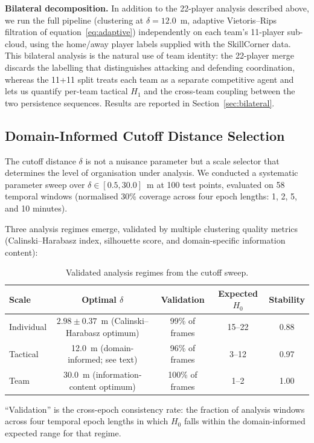 \textbf{Bilateral decomposition.} In addition to the 22-player analysis described above, we run the full pipeline (clustering at \(\delta=12.0\)~m, adaptive Vietoris--Rips filtration of equation~\eqref{eq:adaptive}) independently on each team's 11-player sub-cloud, using the home/away player labels supplied with the SkillCorner data. This bilateral analysis is the natural use of team identity: the 22-player merge discards the labelling that distinguishes attacking and defending coordination, whereas the 11+11 split treats each team as a separate competitive agent and lets us quantify per-team tactical \(H_1\) and the cross-team coupling between the two persistence sequences. Results are reported in Section~\ref{sec:bilateral}.

\subsection{Domain-Informed Cutoff Distance Selection}
\label{sec:cutoff}

The cutoff distance \(\delta\) is not a nuisance parameter but a scale selector that determines the level of organisation under analysis. We conducted a systematic parameter sweep over \(\delta\in[0.5,30.0]\)~m at 100 test points, evaluated on 58 temporal windows (normalised 30\% coverage across four epoch lengths: 1, 2, 5, and 10 minutes).

Three analysis regimes emerge, validated by multiple clustering quality metrics (Calinski--Harabasz index, silhouette score, and domain-specific information content):

\begin{table}[H]
  \centering
  \begin{threeparttable}
    \caption{Validated analysis regimes from the cutoff sweep.}
    \label{tab:regimes}
    \begin{tabular}{@{}lcccc@{}}
      \toprule
      Scale & Optimal \(\delta\) & Validation & Expected \(H_0\) & Stability \\
      \midrule
      Individual & \(2.98\pm0.37\)~m (Calinski--Harabasz optimum) & 99\% of frames & 15--22 & 0.88 \\
      Tactical   & 12.0~m (domain-informed; see text)            & 96\% of frames & 3--12  & 0.97 \\
      Team       & \(30.0\)~m (information-content optimum) & 100\% of frames & 1--2 & 1.00 \\
      \bottomrule
    \end{tabular}
    \begin{tablenotes}
      \small
      \item ``Validation'' is the cross-epoch consistency rate: the fraction of analysis windows across four temporal epoch lengths in which \(H_0\) falls within the domain-informed expected range for that regime.
    \end{tablenotes}
  \end{threeparttable}
\end{table}

